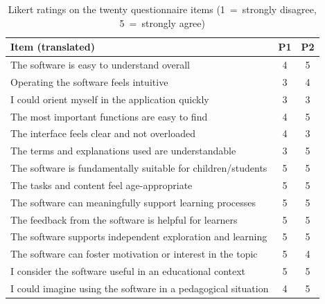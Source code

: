 \begin{table}
  \centering
  \footnotesize
  \caption{Likert ratings on the twenty questionnaire items (1~=~strongly disagree, 5~=~strongly agree)}
  \label{tab:eval-likert}
  \begin{tabularx}{\textwidth}{|X|c|c|}
    \hline
    \textbf{Item (translated)}                                                 & \textbf{P1}   & \textbf{P2}   \\\hline
    The software is easy to understand overall                                 & 4             & 5             \\\hline
    Operating the software feels intuitive                                     & 3             & 4             \\\hline
    I could orient myself in the application quickly                           & 3             & 3             \\\hline
    The most important functions are easy to find                              & 4             & 5             \\\hline
    The interface feels clear and not overloaded                               & 4             & 3             \\\hline
    The terms and explanations used are understandable                         & 3             & 5             \\\hline
    The software is fundamentally suitable for children/students               & 5             & 5             \\\hline
    The tasks and content feel age-appropriate                                 & 5             & 5             \\\hline
    The software can meaningfully support learning processes                   & 5             & 5             \\\hline
    The feedback from the software is helpful for learners                     & 5             & 5             \\\hline
    The software supports independent exploration and learning                 & 5             & 5             \\\hline
    The software can foster motivation or interest in the topic                & 5             & 4             \\\hline
    I consider the software useful in an educational context                   & 5             & 5             \\\hline
    I could imagine using the software in a pedagogical situation              & 4             & 5             \\\hline

\end{tabularx}
\end{table}
